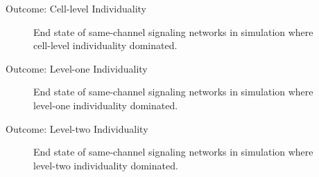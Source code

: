 \begin{frame}{Outcome: Cell-level Individuality}
\begin{figure}
\begin{columns}
\begin{column}{0.6\textwidth}
\end{column}
\begin{column}{0.4\textwidth}
\caption{
End state of same-channel signaling networks in simulation where cell-level individuality dominated.
}
\end{column}
\end{columns}
\end{figure}
\end{frame}

\begin{frame}{Outcome: Level-one Individuality}
\begin{figure}
\begin{columns}
\begin{column}{0.6\textwidth}
\end{column}
\begin{column}{0.4\textwidth}
\caption{
End state of same-channel signaling networks in simulation where level-one individuality dominated.
}
\end{column}
\end{columns}
\end{figure}
\end{frame}

\begin{frame}{Outcome: Level-two Individuality}
\begin{figure}
\begin{columns}
\begin{column}{0.6\textwidth}
\end{column}
\begin{column}{0.4\textwidth}
\caption{
End state of same-channel signaling networks in simulation where level-two individuality dominated.
}
\end{column}
\end{columns}
\end{figure}
\end{frame}

